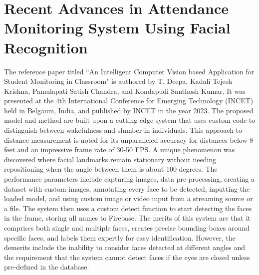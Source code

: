 \documentclass[12pt,a4paper]{report}
\begin{document}
\section{Recent Advances in Attendance Monitoring System Using Facial Recognition}
\par The reference paper titled ``An Intelligent Computer Vision based Application for Student Monitoring in Classroom" is authored by T. Deepa, Kadali Tejesh Krishna, Pamulapati Satish Chandra, and Kondapudi Santhosh Kumar. It was presented at the 4th International Conference for Emerging Technology (INCET) held in Belgaum, India, and published by INCET in the year 2023. The proposed model and method are built upon a cutting-edge system that uses custom code to distinguish between wakefulness and slumber in individuals. This approach to distance measurement is noted for its unparalleled accuracy for distances below 8 feet and an impressive frame rate of 30-50 FPS. A unique phenomenon was discovered where facial landmarks remain stationary without needing repositioning when the angle between them is about 100 degrees. The performance parameters include capturing images, data pre-processing, creating a dataset with custom images, annotating every face to be detected, inputting the loaded model, and using custom image or video input from a streaming source or a file. The system then uses a custom detect function to start detecting the faces in the frame, storing all names to Firebase. The merits of this system are that it comprises both single and multiple faces, creates precise bounding boxes around specific faces, and labels them expertly for easy identification. However, the demerits include the inability to consider faces detected at different angles and the requirement that the system cannot detect faces if the eyes are closed unless pre-defined in the database.\\
\end{document}
